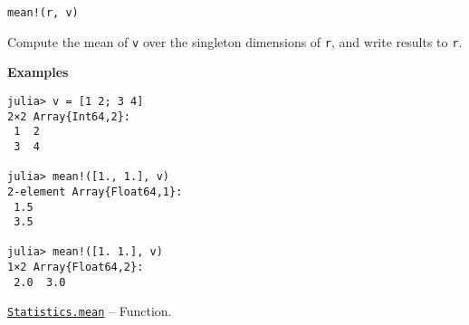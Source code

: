 \begin{adjustwidth}{2em}{0pt}


\begin{verbatim}
mean!(r, v)
\end{verbatim}

Compute the mean of \texttt{v} over the singleton dimensions of \texttt{r}, and write results to \texttt{r}.

\textbf{Examples}


\begin{verbatim}
julia> v = [1 2; 3 4]
2×2 Array{Int64,2}:
 1  2
 3  4

julia> mean!([1., 1.], v)
2-element Array{Float64,1}:
 1.5
 3.5

julia> mean!([1. 1.], v)
1×2 Array{Float64,2}:
 2.0  3.0
\end{verbatim}



\end{adjustwidth}
\hypertarget{15061550543970113934}{} 
\hyperlink{15061550543970113934}{\texttt{Statistics.mean}}  -- {Function.}

